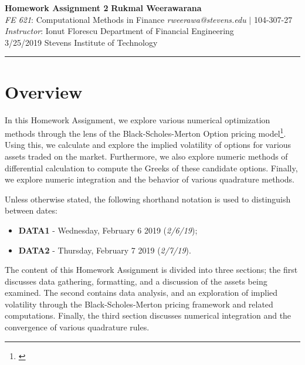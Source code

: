 \documentclass[10pt]{article}
\begin{document}
\thispagestyle{plain}



\noindent
\large\textbf{Homework Assignment 2} \hfill \textbf{Rukmal Weerawarana} \\
\normalsize \textit{FE 621}: Computational Methods in Finance \hfill \textit{rweerawa@stevens.edu} $\mid$ 104-307-27 \\
\textit{Instructor}: Ionut Florescu \hfill Department of Financial Engineering \\
3/25/2019 \hfill Stevens Institute of Technology

\noindent\rule{\linewidth}{.1em}



\section*{Overview}

In this Homework Assignment, we explore various numerical optimization methods through the lens of the Black-Scholes-Merton Option pricing model\footnote{\cite{Shreve2004}}. Using this, we calculate and explore the implied volatility of options for various assets traded on the market. Furthermore, we also explore numeric methods of differential calculation to compute the Greeks of these candidate options. Finally, we explore numeric integration and the behavior of various quadrature methods.

Unless otherwise stated, the following shorthand notation is used to distinguish between dates:

\begin{itemize}
    \item \textbf{DATA1} - Wednesday, February 6 2019 (\textit{2/6/19});
    \item \textbf{DATA2} - Thursday, February 7 2019 (\textit{2/7/19}).
\end{itemize}

The content of this Homework Assignment is divided into three sections; the first discusses data gathering, formatting, and a discussion of the assets being examined. The second contains data analysis, and an exploration of implied volatility through the Black-Scholes-Merton pricing framework and related computations. Finally, the third section discusses numerical integration and the convergence of various quadrature rules.
\end{document}
